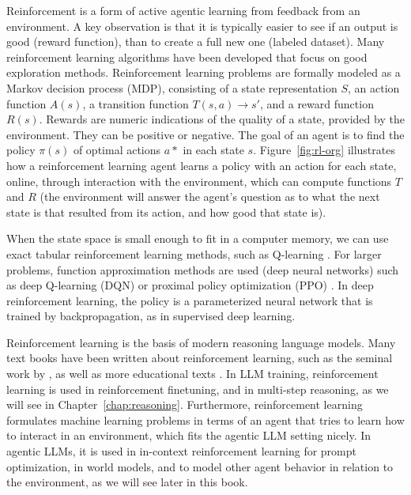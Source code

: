 Reinforcement is a form of active agentic learning from feedback from an environment. A key observation is that it is typically easier to see if an output is good (reward function), than to create a full new one (labeled dataset).
Many reinforcement learning algorithms have been developed that focus on good exploration methods. 
Reinforcement learning problems are formally modeled as a Markov decision process (MDP), consisting of a state representation $S$, an action function $A(s)$, a transition function $T(s, a) \rightarrow s'$, and a reward function $R(s)$. Rewards are numeric indications of the quality of a state, provided by the environment. They can be positive or negative. The goal of an agent is to find the policy $\pi(s)$ of optimal actions $a*$ in each state $s$. 
Figure~\ref{fig:rl-org} illustrates how a reinforcement learning agent learns a policy with an action for each state, online, through interaction with the environment, which can compute functions $T$ and $R$ (the environment will answer the agent's question as to what the next state is that resulted from its action, and how good that state is). 

When the state space is small enough to fit in a computer memory, we can use exact tabular reinforcement learning methods, such as Q-learning \citep{watkins1992q}. For larger problems, function approximation methods are used (deep neural networks) such as deep Q-learning (DQN) \citep{mnih2015human} or proximal policy optimization (PPO) \citep{schulman2017proximal}. In deep reinforcement learning, the policy is a parameterized neural network that is trained by backpropagation, as in supervised deep learning. 

Reinforcement learning is the basis of modern reasoning language models. Many text books have been written about reinforcement learning, such as the seminal work by \citet{sutton2018reinforcement}, as well as more educational texts \citep{graesser2019foundations,plaat2020learning,plaat2022deep}. In LLM training, reinforcement learning is used in reinforcement finetuning, and in multi-step reasoning, as we will see in Chapter~\ref{chap:reasoning}.  Furthermore, reinforcement learning formulates  machine learning problems in terms of an agent that tries to learn how to interact in an environment, which fits the agentic LLM setting nicely. In agentic LLMs, it is used in in-context reinforcement learning for prompt optimization, in world models, and to model other agent behavior in relation to the environment, as we will see later in this book.


